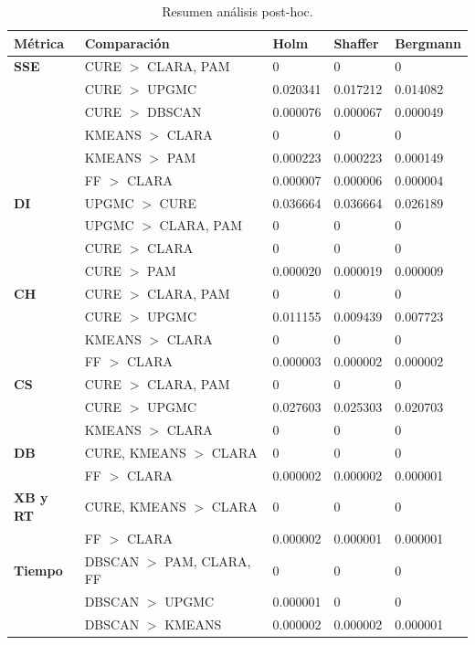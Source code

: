 \begin{table}[H]
\centering
\caption{Resumen an\'alisis post-hoc.}
\label{tab:posthoc}
\footnotesize
\begin{tabular}{@{}lp{4.5cm}lll@{}}
\toprule
\textbf{M\'etrica} & \textbf{Comparaci\'on} & \textbf{Holm} & \textbf{Shaffer} & \textbf{Bergmann} \\
\midrule
\textbf{SSE} & CURE $>$ CLARA, PAM & 0 & 0 & 0 \\
& CURE $>$ UPGMC & 0.020341 & 0.017212 & 0.014082 \\
& CURE $>$ DBSCAN & 0.000076 & 0.000067 & 0.000049 \\
& KMEANS $>$ CLARA & 0 & 0 & 0 \\
& KMEANS $>$ PAM & 0.000223 & 0.000223 & 0.000149 \\
& FF $>$ CLARA & 0.000007 & 0.000006 & 0.000004 \\
\textbf{DI} & UPGMC $>$ CURE & 0.036664 & 0.036664 & 0.026189 \\
& UPGMC $>$ CLARA, PAM & 0 & 0 & 0 \\
& CURE $>$ CLARA & 0 & 0 & 0 \\
& CURE $>$ PAM & 0.000020 & 0.000019 & 0.000009 \\
\textbf{CH} & CURE $>$ CLARA, PAM & 0 & 0 & 0 \\
& CURE $>$ UPGMC & 0.011155 & 0.009439 & 0.007723 \\
& KMEANS $>$ CLARA & 0 & 0 & 0 \\
& FF $>$ CLARA & 0.000003 & 0.000002 & 0.000002 \\
\textbf{CS} & CURE $>$ CLARA, PAM & 0 & 0 & 0 \\
& CURE $>$ UPGMC & 0.027603 & 0.025303 & 0.020703 \\
& KMEANS $>$ CLARA & 0 & 0 & 0 \\
\textbf{DB} & CURE, KMEANS $>$ CLARA & 0 & 0 & 0 \\
& FF $>$ CLARA & 0.000002 & 0.000002 & 0.000001 \\
\textbf{XB y RT} & CURE, KMEANS $>$ CLARA & 0 & 0 & 0 \\
& FF $>$ CLARA & 0.000002 & 0.000001 & 0.000001 \\
\textbf{Tiempo} & DBSCAN $>$ PAM, CLARA, FF & 0 & 0 & 0 \\
& DBSCAN $>$ UPGMC & 0.000001 & 0 & 0 \\
& DBSCAN $>$ KMEANS & 0.000002 & 0.000002 & 0.000001 \\
\bottomrule
\end{tabular}
\end{table}

